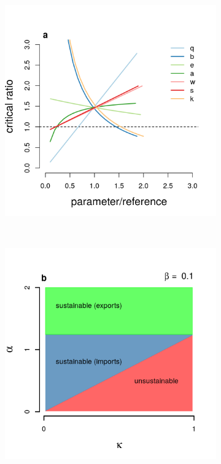\documentclass[9pt,twocolumn,twoside,lineno]{pnas-new}
\begin{document}
\begin{figure}[t!]
  \begin{subfigure}{0.5\textwidth}
   \centering
      \includegraphics[scale=0.4]{figure_2a.png}
  \end{subfigure}%
  ~%
  \begin{subfigure}{0.5\textwidth}
   \centering
      \includegraphics[scale=0.4]{figure_2b.png}
  \end{subfigure}


\end{figure}
\end{document}
